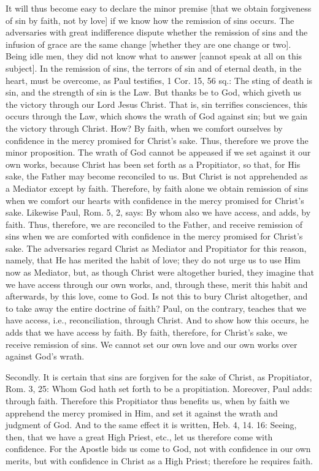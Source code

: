It will thus become easy to declare the minor premise [that we obtain
forgiveness of sin by faith, not by love] if we know how the
remission of sins occurs.  The adversaries with great indifference
dispute whether the remission of sins and the infusion of grace are
the same change [whether they are one change or two].  Being idle men,
they did not know what to answer [cannot speak at all on this
subject].  In the remission of sins, the terrors of sin and of
eternal death, in the heart, must be overcome, as Paul testifies, 1
Cor. 15, 56 sq.: The sting of death is sin, and the strength of sin
is the Law.  But thanks be to God, which giveth us the victory
through our Lord Jesus Christ.  That is, sin terrifies consciences,
this occurs through the Law, which shows the wrath of God against sin;
but we gain the victory through Christ.  How?  By faith, when we
comfort ourselves by confidence in the mercy promised for Christ's
sake.  Thus, therefore we prove the minor proposition.  The wrath of
God cannot be appeased if we set against it our own works, because
Christ has been set forth as a Propitiator, so that, for His sake,
the Father may become reconciled to us.  But Christ is not
apprehended as a Mediator except by faith.  Therefore, by faith alone
we obtain remission of sins when we comfort our hearts with
confidence in the mercy promised for Christ's sake.  Likewise Paul,
Rom. 5, 2, says: By whom also we have access, and adds, by faith.
Thus, therefore, we are reconciled to the Father, and receive
remission of sins when we are comforted with confidence in the mercy
promised for Christ's sake.  The adversaries regard Christ as
Mediator and Propitiator for this reason, namely, that He has merited
the habit of love; they do not urge us to use Him now as Mediator,
but, as though Christ were altogether buried, they imagine that we
have access through our own works, and, through these, merit this
habit and afterwards, by this love, come to God.  Is not this to bury
Christ altogether, and to take away the entire doctrine of faith?
Paul, on the contrary, teaches that we have access, i.e.,
reconciliation, through Christ.  And to show how this occurs, he adds
that we have access by faith.  By faith, therefore, for Christ's sake,
we receive remission of sins.  We cannot set our own love and our
own works over against God's wrath.

Secondly.  It is certain that sins are forgiven for the sake of
Christ, as Propitiator, Rom. 3, 25: Whom God hath set forth to be a
propitiation.  Moreover, Paul adds: through faith.  Therefore this
Propitiator thus benefits us, when by faith we apprehend the mercy
promised in Him, and set it against the wrath and judgment of God.
And to the same effect it is written, Heb. 4, 14. 16: Seeing, then,
that we have a great High Priest, etc., let us therefore come with
confidence.  For the Apostle bids us come to God, not with confidence
in our own merits, but with confidence in Christ as a High Priest;
therefore he requires faith.


